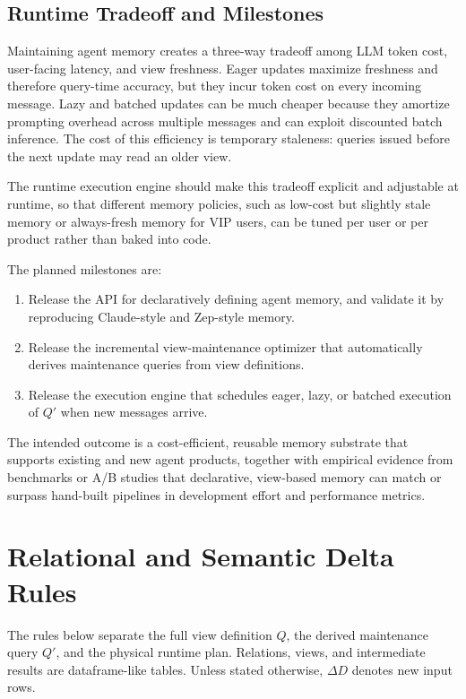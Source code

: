 \documentclass[11pt]{article}
\newcommand{\Q}{Q}
\newcommand{\DQ}{Q'}
\newcommand{\DeltaD}{\Delta D}
\begin{document}
\subsection{Runtime Tradeoff and Milestones}

Maintaining agent memory creates a three-way tradeoff among LLM token cost,
user-facing latency, and view freshness. Eager updates maximize freshness and
therefore query-time accuracy, but they incur token cost on every incoming
message. Lazy and batched updates can be much cheaper because they amortize
prompting overhead across multiple messages and can exploit discounted batch
inference. The cost of this efficiency is temporary staleness: queries issued
before the next update may read an older view.

The runtime execution engine should make this tradeoff explicit and adjustable
at runtime, so that different memory policies, such as low-cost but slightly
stale memory or always-fresh memory for VIP users, can be tuned per user or per
product rather than baked into code.

The planned milestones are:

\begin{enumerate}[leftmargin=*]
  \item Release the API for declaratively defining agent memory, and validate it
  by reproducing Claude-style and Zep-style memory.

  \item Release the incremental view-maintenance optimizer that automatically
  derives maintenance queries from view definitions.

  \item Release the execution engine that schedules eager, lazy, or batched
  execution of \(\DQ\) when new messages arrive.
\end{enumerate}

The intended outcome is a cost-efficient, reusable memory substrate that
supports existing and new agent products, together with empirical evidence from
benchmarks or A/B studies that declarative, view-based memory can match or
surpass hand-built pipelines in development effort and performance metrics.

\section{Relational and Semantic Delta Rules}

The rules below separate the full view definition \(\Q\), the derived
maintenance query \(\DQ\), and the physical runtime plan. Relations, views, and
intermediate results are dataframe-like tables. Unless stated otherwise,
\(\DeltaD\) denotes new input rows.
\end{document}
